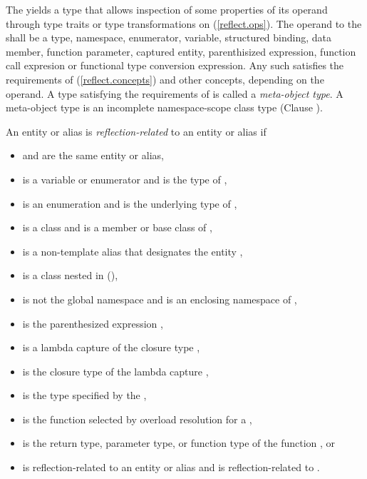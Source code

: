\begin{std.txt}\color{addclr}

    \pnum
    The  yields a type  that allows
    inspection of some properties of its operand through type traits or type
    transformations on  (\ref{reflect.ops}).  The operand to the
     shall be a type, namespace, enumerator,
    variable, structured binding, data member, function parameter, captured
    entity, parenthisized expression, function call expresion or functional type
    conversion expression.  Any such  satisfies the requirements of
     (\ref{reflect.concepts}) and other 
    concepts, depending on the operand.  A type satisfying the requirements of
     is called a \emph{meta-object type}.  A meta-object
    type is an incomplete namespace-scope class type (Clause ).

    \pnum
    An entity or alias  is \emph{reflection-related} to an entity or
    alias  if

    \begin{itemize}
      \item {} and  are the same entity or alias,
      \item {} is a variable or enumerator and  is the type of ,
      \item {} is an enumeration and  is the underlying type of ,
      \item {} is a class and  is a member or base class of ,
      \item {} is a non-template alias that designates the entity ,
      \item {} is a class nested in  (),
      \item {} is not the global namespace and  is an enclosing namespace of ,
      \item {} is the parenthesized expression ,
      \item {} is a lambda capture of the closure type ,
      \item {} is the closure type of the lambda capture ,
      \item {} is the type specified by the  ,
      \item {} is the function selected by overload resolution for a  ,
      \item {} is the return type, parameter type, or function type of the function , or
      \item {} is reflection-related to an entity or alias  and  is reflection-related to .
    \end{itemize}


\end{std.txt}
